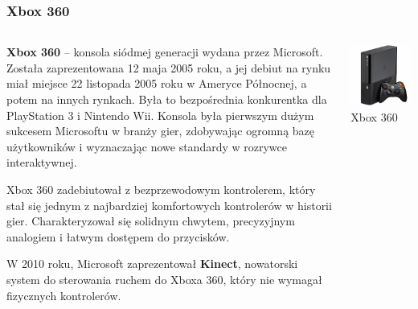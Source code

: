 \documentclass[8pt]{beamer}
\begin{document}
\begin{frame}
\frametitle{Xbox 360}
\begin{columns}

\begin{column}{0.6\textwidth}
\textbf {Xbox 360} – konsola siódmej generacji wydana przez Microsoft. Została zaprezentowana 12 maja 2005 roku, a jej debiut na rynku miał miejsce 22 listopada 2005 roku w Ameryce Północnej, a potem na innych rynkach. Była to bezpośrednia konkurentka dla PlayStation 3 i Nintendo Wii. Konsola była pierwszym dużym sukcesem Microsoftu w branży gier, zdobywając ogromną bazę użytkowników i wyznaczając nowe standardy w rozrywce interaktywnej.

\vspace{0.5em} 
Xbox 360 zadebiutował z bezprzewodowym kontrolerem, który stał się jednym z najbardziej komfortowych kontrolerów w historii gier. Charakteryzował się solidnym chwytem, precyzyjnym analogiem i łatwym dostępem do przycisków.

\vspace{0.5em}
W 2010 roku, Microsoft zaprezentował \textbf {Kinect}, nowatorski system do sterowania ruchem do Xboxa 360, który nie wymagał fizycznych kontrolerów.

\end{column}

\begin{column}{0.35\textwidth}
        \centering
        \includegraphics[width=\textwidth]{xbox360.jpg} 
        {\small Xbox 360} 
    \end{column}
\end{columns}

\end{frame}
\end{document}
